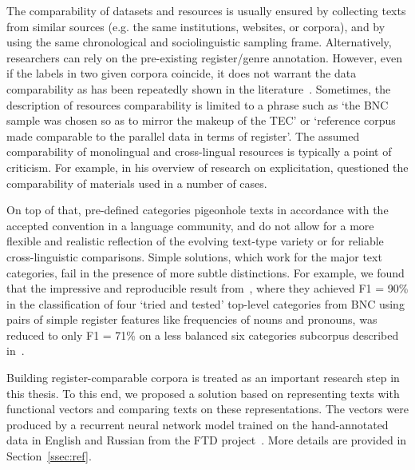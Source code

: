 The comparability of datasets and resources is usually ensured by collecting texts from similar sources (e.g. the same institutions, websites, or corpora), and by using the same chronological and sociolinguistic sampling frame. 
Alternatively, researchers can rely on the pre-existing register/genre annotation. However, even if the labels in two given corpora coincide, it does not warrant the data comparability as has been repeatedly shown in the literature~\cite{Sharoff2018, Delaere2015}. %
Sometimes, the description of resources comparability is limited to a phrase such as `the BNC sample was chosen so as to mirror the makeup of the TEC' or `reference corpus made comparable to the parallel data in terms of register'. The assumed comparability of monolingual and cross-lingual resources is typically a point of criticism. For example, in his overview of research on explicitation, \citet{Becher2011} questioned the comparability of materials used in a number of cases. 

On top of that, pre-defined categories pigeonhole texts in accordance with the accepted convention in a language community, and do not allow for a more flexible and realistic reflection of the evolving text-type variety or for reliable cross-linguistic comparisons. Simple solutions, which work for the major text categories, fail in the presence of more subtle distinctions. For example, we found that the impressive and reproducible result from~\citet{Lijffijt2017}, where they achieved F1 = 90\% in the classification of four `tried and tested' top-level categories from \gls{BNC} using pairs of simple register features like frequencies of nouns and pronouns, was reduced to only F1 = 71\% on a less balanced six categories subcorpus described in~\citet{Kunilovskaya2019similar}.

Building register-comparable corpora is treated as an important research step in this thesis. To this end, we proposed a solution based on representing texts with functional vectors and comparing texts on these representations. The vectors were produced by a recurrent neural network model trained on the hand-annotated data in English and Russian from the \gls{FTD} project~\cite{Sharoff2018}. More details are provided in Section~\ref{ssec:ref}.

